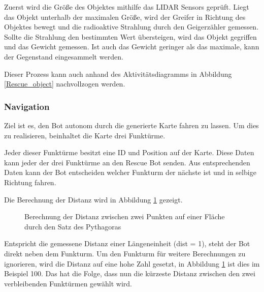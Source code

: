 Zuerst wird die Größe des Objektes mithilfe das LIDAR Sensors geprüft. Liegt das Objekt unterhalb der maximalen Größe, wird der Greifer in Richtung des Objektes bewegt und die radioaktive Strahlung durch den Geigerzähler gemessen. Sollte die Strahlung den bestimmten Wert übersteigen, wird das Objekt gegriffen und das Gewicht gemessen. Ist auch das Gewicht geringer als das maximale, kann der Gegenstand eingesammelt werden. 

Dieser Prozess kann auch anhand des Aktivitätsdiagramms in Abbildung \ref{Rescue_object} nachvollzogen werden. 
\subsubsection{Navigation}
\label{nav}
Ziel ist es, den Bot autonom durch die generierte Karte fahren zu lassen. Um dies zu realisieren, beinhaltet die Karte drei Funktürme.

Jeder dieser Funktürme besitzt eine ID und Position auf der Karte. Diese Daten kann jeder der drei Funktürme an den Rescue Bot senden. Aus entsprechenden Daten kann der Bot entscheiden welcher Funkturm der nächste ist und in selbige Richtung fahren. 

Die Berechnung der Distanz wird in Abbildung \ref{dist} gezeigt. 
\begin{figure}[H]
  \caption{Berechnung der Distanz zwischen zwei Punkten auf einer Fläche durch den Satz des Pythagoras}
  \label{dist}
\end{figure}

Entspricht die gemessene Distanz einer Längeneinheit (dist = 1), steht der Bot direkt neben dem Funkturm. Um den Funkturm für weitere Berechnungen zu ignorieren, wird die Distanz auf eine hohe Zahl gesetzt, in Abbildung \ref{dist} ist dies im Beispiel 100. Das hat die Folge, dass nun die kürzeste Distanz zwischen den zwei verbleibenden Funktürmen gewählt wird.

